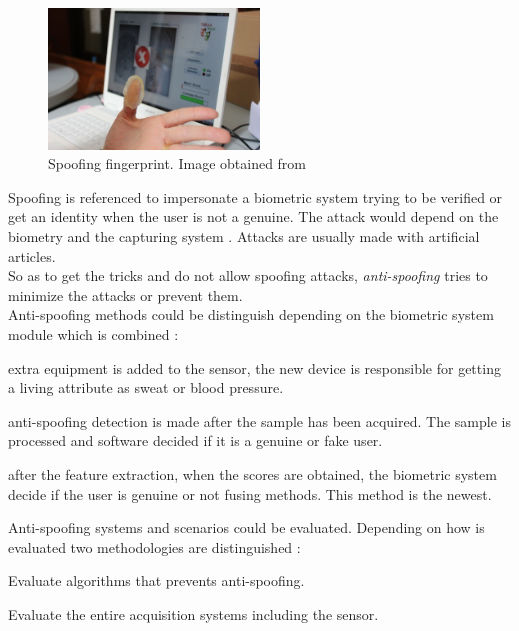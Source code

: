 \begin{figure}[htb]
\centering
\includegraphics[width=0.5\textwidth]{images_miscelaneus/spoofing_fingerprint.jpg}
\caption{Spoofing fingerprint. Image obtained from \cite{fingerprint_image}} \label{fig:Spoof_fingerprint}
\end{figure}

Spoofing is referenced to impersonate a biometric system trying to be verified or get an identity when the user is not a genuine. The attack would depend on the biometry and the capturing system \cite{Spoofing_survey}. Attacks are usually made with artificial articles.\\

So as to get the tricks and do not allow spoofing attacks, \textit{anti-spoofing} tries to minimize the attacks or prevent them.\\

Anti-spoofing methods could be distinguish depending on the biometric system module which is combined \cite{Spoofing_survey}:
\begin{description}[itemsep=2pt,topsep=8pt,parsep=0pt,partopsep=20pt]
\item[Sensor level:] extra equipment is added to the sensor, the new device is responsible for getting a living attribute as sweat or blood pressure.
\item[Feature level:] anti-spoofing detection is made after the sample has been acquired. The sample is processed and software decided if it is a genuine or fake user.
\item[Score level:] after the feature extraction, when the scores are obtained, the biometric system decide if the user is genuine or not fusing methods. This method is the newest.
\end{description}

Anti-spoofing systems and scenarios could be evaluated. Depending on how is evaluated two methodologies are distinguished \cite{Spoofing_survey}:
\begin{description}[itemsep=2pt,topsep=8pt,parsep=0pt,partopsep=20pt]
\item[Algorithm-based or technology evaluation:] Evaluate algorithms that prevents anti-spoofing.
\item[System-based or scenario evaluation:] Evaluate the entire acquisition systems including the sensor.
\end{description}

